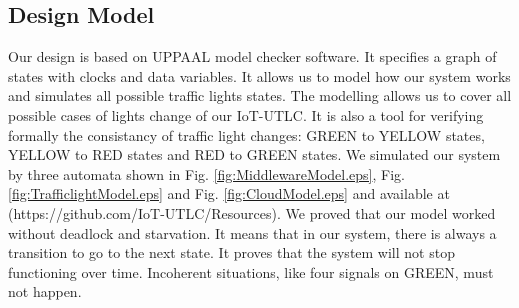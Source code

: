 \documentclass[conference]{../../setup/IEEEtran}
\begin{document}






\subsection{Design Model}

Our design is based on UPPAAL model checker software. It specifies a graph of states with clocks and data variables. It allows us to model how our system works and simulates all possible traffic lights states. The modelling allows us to cover all possible cases of lights change of our IoT-UTLC. It is also a tool for verifying formally the consistancy of traffic light changes: GREEN to YELLOW states, YELLOW to RED states and RED to GREEN states.  
We simulated our system by three automata shown in Fig. \ref{fig:MiddlewareModel.eps}, Fig. \ref{fig:TrafficlightModel.eps} and Fig. \ref{fig:CloudModel.eps} and available at (https://github.com/IoT-UTLC/Resources).
We proved that our model worked without deadlock and starvation. It means that in our system, there is always a transition to go to the next state. It proves that the system will not stop functioning over time. Incoherent situations, like four signals on GREEN, must not happen.   

\end{document}
